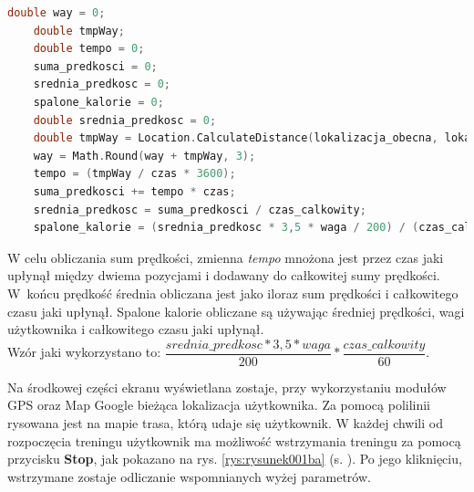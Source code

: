 \begin{lstlisting}[caption=Obliczanie parametrów treningu, label={lst:listing-ps3}, language=C++]
	double way = 0;
	double tmpWay;
	double tempo = 0;
	suma_predkosci = 0;
	srednia_predkosc = 0;
	spalone_kalorie = 0;
	double srednia_predkosc = 0;
	double tmpWay = Location.CalculateDistance(lokalizacja_obecna, lokalizacja_poprzednia, dystans);
	way = Math.Round(way + tmpWay, 3);
	tempo = (tmpWay / czas * 3600);
	suma_predkosci += tempo * czas;
	srednia_predkosc = suma_predkosci / czas_calkowity;
	spalone_kalorie = (srednia_predkosc * 3,5 * waga / 200) / (czas_calkowity / 60)
\end{lstlisting}

W celu obliczania sum prędkości, zmienna \textit{tempo} mnożona jest przez czas jaki upłynął między dwiema pozycjami i dodawany do całkowitej sumy prędkości. W~końcu prędkość średnia obliczana jest jako iloraz sum prędkości i całkowitego czasu jaki upłynął. Spalone kalorie obliczane są używając średniej prędkości, wagi użytkownika i całkowitego czasu jaki upłynął.\\ Wzór jaki wykorzystano to: $\dfrac{srednia\_predkosc*3,5*waga}{200} * \dfrac{czas\_calkowity}{60}$.

Na środkowej części ekranu wyświetlana zostaje, przy wykorzystaniu modułów GPS oraz Map Google bieżąca lokalizacja użytkownika. Za pomocą polilinii rysowana jest na mapie trasa, którą udaje się użytkownik. W każdej chwili od rozpoczęcia treningu użytkownik ma możliwość wstrzymania treningu za pomocą przycisku \textbf{Stop}, jak pokazano na rys. \ref{rys:rysunek001ba} (s. \pageref{rys:rysunek001ba}). Po jego kliknięciu, wstrzymane zostaje odliczanie wspomnianych wyżej parametrów.

